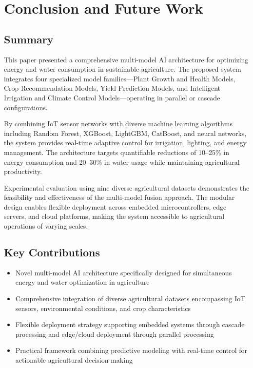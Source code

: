 \documentclass[conference]{IEEEtran}
\begin{document}
\section{Conclusion and Future Work}

\subsection{Summary}

This paper presented a comprehensive multi-model AI architecture for optimizing energy and water consumption in sustainable agriculture. The proposed system integrates four specialized model families—Plant Growth and Health Models, Crop Recommendation Models, Yield Prediction Models, and Intelligent Irrigation and Climate Control Models—operating in parallel or cascade configurations.

By combining IoT sensor networks with diverse machine learning algorithms including Random Forest, XGBoost, LightGBM, CatBoost, and neural networks, the system provides real-time adaptive control for irrigation, lighting, and energy management. The architecture targets quantifiable reductions of 10--25\% in energy consumption and 20--30\% in water usage while maintaining agricultural productivity.

Experimental evaluation using nine diverse agricultural datasets demonstrates the feasibility and effectiveness of the multi-model fusion approach. The modular design enables flexible deployment across embedded microcontrollers, edge servers, and cloud platforms, making the system accessible to agricultural operations of varying scales.

\subsection{Key Contributions}

\begin{itemize}
\item Novel multi-model AI architecture specifically designed for simultaneous energy and water optimization in agriculture
\item Comprehensive integration of diverse agricultural datasets encompassing IoT sensors, environmental conditions, and crop characteristics
\item Flexible deployment strategy supporting embedded systems through cascade processing and edge/cloud deployment through parallel processing
\item Practical framework combining predictive modeling with real-time control for actionable agricultural decision-making
\end{itemize}
\end{document}
